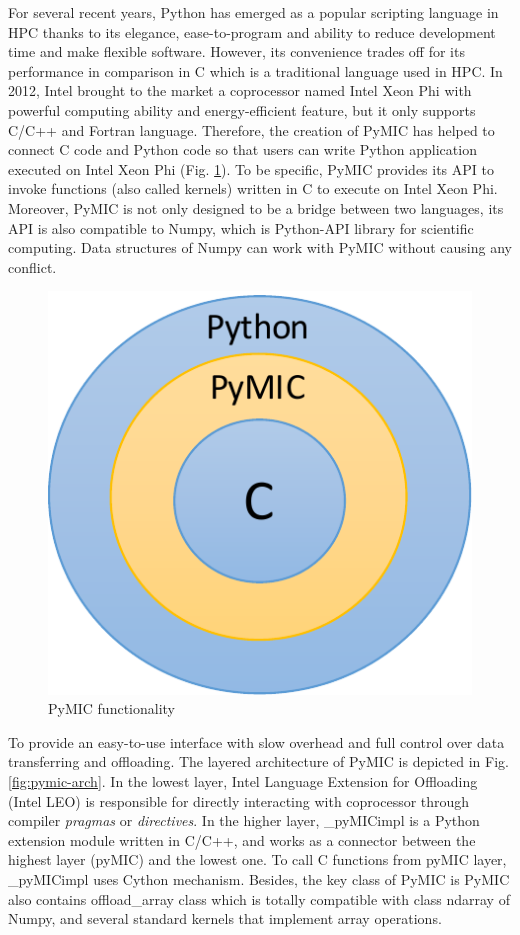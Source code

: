 For several recent years, Python has emerged as a popular scripting language in HPC thanks to its elegance, ease-to-program and ability to reduce development time and make flexible software. However, its convenience trades off for its performance in comparison in C which is a traditional language used in HPC. In 2012, Intel brought to the market a coprocessor named Intel Xeon Phi with powerful computing ability and energy-efficient feature, but it only supports C/C++ and Fortran language. Therefore, the creation of PyMIC \cite{klemm2014pymic} has helped to connect C code and Python code so that users can write Python application executed on Intel Xeon Phi (Fig. \ref{fig:pymic-feat}). To be specific, PyMIC provides its API to invoke functions (also called kernels) written in C to execute on Intel Xeon Phi. Moreover, PyMIC is not only designed to be a bridge between two languages, its API is also compatible to Numpy, which is Python-API library for scientific computing. Data structures of Numpy can work with PyMIC without causing any conflict.

\begin{figure}[h]
\centering
\includegraphics[scale=0.5]{img/pymic-feat.pdf}
\caption{PyMIC functionality}
\label{fig:pymic-feat}
\end{figure}

To provide an easy-to-use interface with slow overhead and full control over data transferring and offloading. The layered architecture of PyMIC is depicted in Fig. \ref{fig:pymic-arch}. In the lowest layer, Intel Language Extension for Offloading (Intel LEO) is responsible for directly interacting with coprocessor through compiler \textit{pragmas} or \textit{directives}. In the higher layer, \_pyMICimpl is a Python extension module written in C/C++, and works as a connector between the highest layer (pyMIC) and the lowest one. To call C functions from pyMIC layer, \_pyMICimpl uses Cython mechanism. Besides, the key class of PyMIC is PyMIC also contains offload\_array class which is totally compatible with class ndarray of Numpy, and several standard kernels that implement array operations.		

